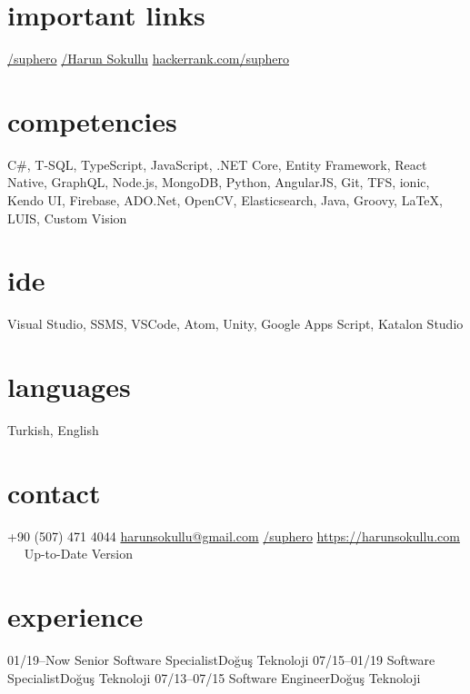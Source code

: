 \documentclass[]{../friggeri-cv} %
\begin{document}

\begin{aside}
\section{important links}
\href{https://github.com/suphero}{\faGithub/suphero}
\href{https://play.google.com/store/apps/developer?id=Harun+Sokullu}{\faAndroid/Harun Sokullu}
\href{https://www.hackerrank.com/suphero}{hackerrank.com/suphero}
\section{competencies}
C\#, T-SQL, TypeScript, JavaScript, .NET Core, Entity Framework, React Native, GraphQL, Node.js, MongoDB, Python, AngularJS, Git, TFS, ionic, Kendo UI, Firebase, ADO.Net, OpenCV, Elasticsearch, Java, Groovy, \LaTeX, LUIS, Custom Vision
\section{ide}
Visual Studio, SSMS, VSCode, Atom, Unity, Google Apps Script, Katalon Studio
\section{languages}
Turkish, English
\section{contact}
+90 (507) 471 4044
\href{mailto:harunsokullu@gmail.com}{harunsokullu@gmail.com}
\href{https://www.linkedin.com/in/suphero}{\faLinkedin/suphero}
\href{https://harunsokullu.com}{https://harunsokullu.com}
~~
Up-to-Date Version
\end{aside}

\section{experience}

\begin{entrylist}

\entry
{01/19--Now}
{Senior Software Specialist}{Doğuş Teknoloji}{}
\entry
{07/15--01/19}
{Software Specialist}{Doğuş Teknoloji}{}
\entry
{07/13--07/15}
{Software Engineer}{Doğuş Teknoloji}{}

\end{entrylist}
\end{document}
